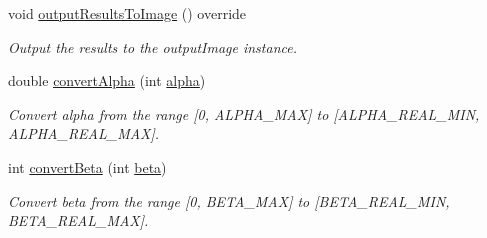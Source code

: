 \begin{DoxyCompactItemize}
void \hyperlink{classmultiscale_1_1analysis_1_1RegionDetector_a23a3ada51983d2a3041f403323e27d06}{output\-Results\-To\-Image} () override
\begin{DoxyCompactList}\small\item\em \-Output the results to the output\-Image instance. \end{DoxyCompactList}\item 
double \hyperlink{classmultiscale_1_1analysis_1_1RegionDetector_a3de7a4d365c182917b74117a22075ec4}{convert\-Alpha} (int \hyperlink{classmultiscale_1_1analysis_1_1RegionDetector_ab768a3bbfff9835b441a889ab2cb05a6}{alpha})
\begin{DoxyCompactList}\small\item\em \-Convert alpha from the range \mbox{[}0, \-A\-L\-P\-H\-A\-\_\-\-M\-A\-X\mbox{]} to \mbox{[}\-A\-L\-P\-H\-A\-\_\-\-R\-E\-A\-L\-\_\-\-M\-I\-N, \-A\-L\-P\-H\-A\-\_\-\-R\-E\-A\-L\-\_\-\-M\-A\-X\mbox{]}. \end{DoxyCompactList}\item 
int \hyperlink{classmultiscale_1_1analysis_1_1RegionDetector_a60083ca10a42c25d67e371506cbf5620}{convert\-Beta} (int \hyperlink{classmultiscale_1_1analysis_1_1RegionDetector_a23c831170c2264dd7e59067a1a7d3c8e}{beta})
\begin{DoxyCompactList}\small\item\em \-Convert beta from the range \mbox{[}0, \-B\-E\-T\-A\-\_\-\-M\-A\-X\mbox{]} to \mbox{[}\-B\-E\-T\-A\-\_\-\-R\-E\-A\-L\-\_\-\-M\-I\-N, \-B\-E\-T\-A\-\_\-\-R\-E\-A\-L\-\_\-\-M\-A\-X\mbox{]}. \end{DoxyCompactList}\end{DoxyCompactItemize}
